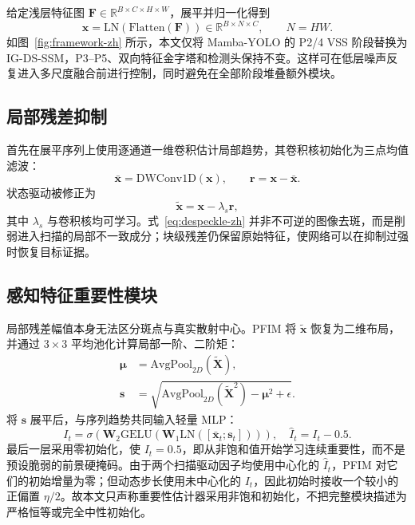 \documentclass[10pt,twocolumn]{ctexart}
\newcommand{\method}{IG-DS-SSM}
\begin{document}
给定浅层特征图 $\mathbf{F}\in\mathbb{R}^{B\times C\times H\times W}$，展平并归一化得到
\begin{equation}
\mathbf{x}=\mathrm{LN}(\mathrm{Flatten}(\mathbf{F}))
\in\mathbb{R}^{B\times N\times C},\qquad N=HW.
\end{equation}
如图~\ref{fig:framework-zh} 所示，本文仅将 Mamba-YOLO 的 P2/4 VSS 阶段替换为 \method，P3--P5、双向特征金字塔和检测头保持不变。这样可在低层噪声反复进入多尺度融合前进行控制，同时避免在全部阶段堆叠额外模块。

\subsection{局部残差抑制}

首先在展平序列上使用逐通道一维卷积估计局部趋势，其卷积核初始化为三点均值滤波：
\begin{equation}
\bar{\mathbf{x}}=\mathrm{DWConv1D}(\mathbf{x}),\qquad
\mathbf{r}=\mathbf{x}-\bar{\mathbf{x}}.
\end{equation}
状态驱动被修正为
\begin{equation}
\widetilde{\mathbf{x}}=\mathbf{x}-\lambda_s\mathbf{r},
\label{eq:despeckle-zh}
\end{equation}
其中 $\lambda_s$ 与卷积核均可学习。式~\ref{eq:despeckle-zh} 并非不可逆的图像去斑，而是削弱进入扫描的局部不一致成分；块级残差仍保留原始特征，使网络可以在抑制过强时恢复目标证据。

\subsection{感知特征重要性模块}

局部残差幅值本身无法区分斑点与真实散射中心。PFIM 将 $\widetilde{\mathbf{x}}$ 恢复为二维布局，并通过 $3\times3$ 平均池化计算局部一阶、二阶矩：
\begin{align}
\boldsymbol{\mu}&=\mathrm{AvgPool}_{2D}(\widetilde{\mathbf{X}}),\\
\mathbf{s}&=\sqrt{\mathrm{AvgPool}_{2D}(\widetilde{\mathbf{X}}^2)-\boldsymbol{\mu}^2+\epsilon}.
\end{align}
将 $\mathbf{s}$ 展平后，与序列趋势共同输入轻量 MLP：
\begin{equation}
I_t=\sigma\!\left(\mathbf{W}_2\mathrm{GELU}
\left(\mathbf{W}_1\mathrm{LN}([\bar{\mathbf{x}}_t;\mathbf{s}_t])\right)\right),
\quad \widehat I_t=I_t-0.5.
\label{eq:pfim-zh}
\end{equation}
最后一层采用零初始化，使 $I_t=0.5$，即从非饱和值开始学习连续重要性，而不是预设脆弱的前景硬掩码。由于两个扫描驱动因子均使用中心化的 $\widehat I_t$，PFIM 对它们的初始增量为零；但动态步长使用未中心化的 $I_t$，因此初始时接收一个较小的正偏置 $\eta/2$。故本文只声称重要性估计器采用非饱和初始化，不把完整模块描述为严格恒等或完全中性初始化。
\end{document}
